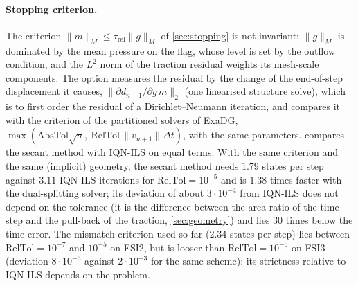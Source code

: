 \documentclass[11pt,a4paper]{article}
\theoremstyle{definition}
\theoremstyle{remark}
\newcommand{\M}{M}
\begin{document}
\paragraph{Stopping criterion.} The criterion $\|m\|_{\M}\le\tau_{\mathrm{rel}}\|g\|_{\M}$ of
\cref{sec:stopping} is not invariant: $\|g\|_{\M}$ is dominated by the mean pressure on the flag,
whose level is set by the outflow condition, and the $L^2$ norm of the traction residual weights its
mesh-scale components. The option 
measures the residual by the change of the end-of-step displacement it causes,
$\|\partial d_{n+1}/\partial g\,m\|_2$ (one linearised structure solve), which is to first order the
residual of a Dirichlet--Neumann iteration, and compares it with the criterion of the partitioned
solvers of ExaDG, $\max(\mathrm{AbsTol}\sqrt{n},\ \mathrm{RelTol}\,\|v_{n+1}\|\Delta t)$, with the
same parameters.  compares the secant method with IQN-ILS on equal terms. With
the same criterion and the same (implicit) geometry, the secant method needs $1.79$ states per step
against $3.11$ IQN-ILS iterations for $\mathrm{RelTol}=10^{-5}$ and is $1.38$ times faster with the
dual-splitting solver; its deviation of about $3\cdot10^{-4}$ from IQN-ILS does not depend on the
tolerance (it is the difference between the area ratio of the time step and the pull-back of the
traction, \cref{sec:geometry}) and lies $30$ times below the time error. The mismatch criterion
used so far ($2.34$ states per step) lies between $\mathrm{RelTol}=10^{-7}$ and $10^{-5}$ on FSI2,
but is looser than $\mathrm{RelTol}=10^{-5}$ on FSI3 (deviation $8\cdot10^{-3}$ against
$2\cdot10^{-3}$ for the same scheme): its strictness relative to IQN-ILS depends on the problem.
\end{document}
